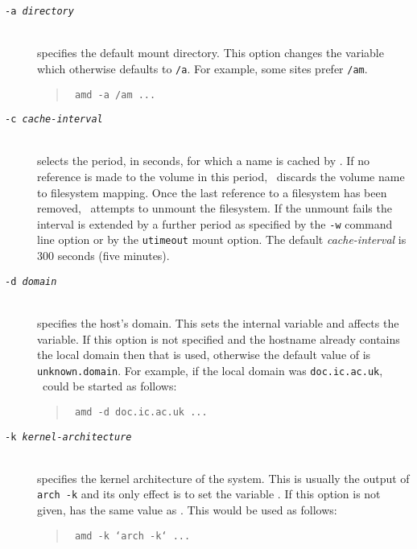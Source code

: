 \begin{description}
\item[\tt -a \em directory]\mbox{}\\
specifies the default mount directory.
This option changes the variable  which
otherwise defaults to {\tt /a}.
For example, some sites prefer {\tt /am}.
\begin{quote}
\tt
amd -a /am ...
\end{quote}

\item[\tt -c \em cache-interval]\mbox{}\\
selects the period, in seconds, for which a name is cached by \amd.
If no reference is made to the volume in this period,
\amd\ discards the volume name to filesystem mapping.  Once the last
reference to a filesystem has been removed, \amd\ attempts to unmount the filesystem.
If the unmount fails the interval is extended by a further period
as specified by the {\tt -w} command line option or by the {\tt utimeout} mount option.
The default {\em cache-interval} is 300 seconds (five minutes).

\item[\tt -d \em domain]\mbox{}\\
specifies the host's domain.  This sets the internal variable 
and affects the  variable.
If this option is not specified and
the hostname already contains the local domain then that is
used, otherwise the default value of  is {\tt unknown.domain}.
For example, if the local domain was {\tt doc.ic.ac.uk}, \amd\ could be
started as follows:
\begin{quote}
\tt
amd -d doc.ic.ac.uk ...
\end{quote}

\item[\tt -k \em kernel-architecture]\mbox{}\\
specifies the kernel architecture of the system.  This is usually
the output of {\tt arch -k} and its only effect is to set the
variable .  If this option is not given, 
has the same value as .
This would be used as follows:
\begin{quote}
\tt
amd -k `arch -k` ...
\end{quote}


\end{description}
